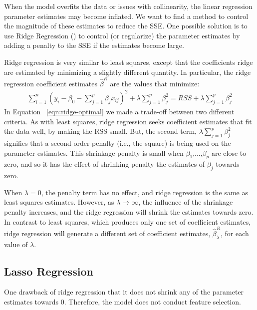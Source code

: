 When the model overfits the data or issues with collinearity,
the linear regression parameter estimates may become inflated.  We want to find
a method to control the magnitude of these estimates to reduce the SSE.
One possible solution is to use Ridge Regression (\textcite{hoerl1970ridge})  to
control (or regularize) the parameter estimates by adding a penalty to the SSE
if the estimates become large.

Ridge regression is very similar to least squares, except that the coefficients
ridge are estimated by minimizing a slightly different quantity. In particular,
the ridge regression coefficient estimates $\hat{\beta}^R$ are the
values that minimize:
\begin{eqnarray}
    \label{eqn:ridge-optimal}
    \sum_{i=1}^{n}(y_i -\beta_0 - \sum_{j=1}^{p}\beta_j x_{ij}) ^ 2 + \lambda
    \sum_{j=1}^{p}\beta_{j}^2 = RSS + \lambda \sum_{j=1}^{p}\beta_{j}^2
\end{eqnarray}
In  Equation  ~\ref{eqn:ridge-optimal} we made a trade-off between two different
criteria. As with least squares, ridge regression seeks coefficient estimates
that fit the data well, by making the RSS small. But, the second term, $\lambda
\sum_{j=1}^{p}\beta_{j}^2$ signifies that a second-order penalty (i.e., the
square) is being used on the parameter estimates.
This shrinkage penalty is small when $\beta_1$,...,$\beta_p$ are close to zero,
and so it has the effect of shrinking penalty the estimates of $\beta_j$ towards
zero.

When $\lambda = 0$, the penalty term has no effect, and ridge regression is the same
as least squares estimates. However, as $\lambda \to \infty$, the influence of
the shrinkage penalty increases, and the ridge regression will shrink the
estimates towards  zero.
In contrast to least squares, which produces only one set of coefficient
estimates, ridge regression will generate a different set of coefficient
estimates, $\hat{\beta}_{\lambda} ^ {R}$, for each value of $\lambda$.

\subsection{Lasso Regression}
One drawback of ridge regression that it does not shrink any of the parameter
estimates towards 0. Therefore, the model does not conduct feature selection.


